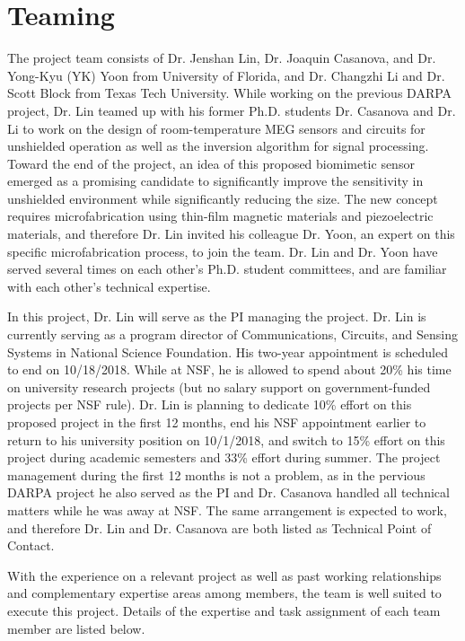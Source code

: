 \section{Teaming}
The project team consists of Dr. Jenshan Lin, Dr. Joaquin Casanova, and Dr. Yong-Kyu (YK) Yoon from University of Florida, and Dr. Changzhi Li and Dr. Scott Block from Texas Tech University. While working on the previous DARPA project, Dr. Lin teamed up with his former Ph.D. students Dr. Casanova and Dr. Li to work on the design of room-temperature MEG sensors and circuits for unshielded operation as well as the inversion algorithm for signal processing. Toward the end of the project, an idea of this proposed biomimetic sensor emerged as a promising candidate to significantly improve the sensitivity in unshielded environment while significantly reducing the size. The new concept requires microfabrication using thin-film magnetic materials and piezoelectric materials, and therefore Dr. Lin invited his colleague Dr. Yoon, an expert on this specific microfabrication process, to join the team. Dr. Lin and Dr. Yoon have served several times on each other's Ph.D. student committees, and are familiar with each other’s technical expertise.

In this project, Dr. Lin will serve as the PI managing the project. Dr. Lin is currently serving as a program director of Communications, Circuits, and Sensing Systems in National Science Foundation. His two-year appointment is scheduled to end on 10/18/2018. While at NSF, he is allowed to spend about 20\% his time on university research projects (but no salary support on government-funded projects per NSF rule). Dr. Lin is planning to dedicate 10\% effort on this proposed project in the first 12 months, end his NSF appointment earlier to return to his university position on 10/1/2018, and switch to 15\% effort on this project during academic semesters and 33\% effort during summer. The project management during the first 12 months is not a problem, as in the pervious DARPA project he also served as the PI and Dr. Casanova handled all technical matters while he was away at NSF. The same arrangement is expected to work, and therefore Dr. Lin and Dr. Casanova are both listed as Technical Point of Contact. 

With the experience on a relevant project as well as past working relationships and complementary expertise areas among members, the team is well suited to execute this project. Details of the expertise and task assignment of each team member are listed below. 

